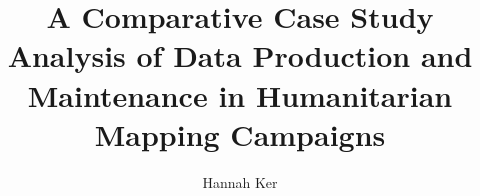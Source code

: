\makeatletter
\renewcommand {\@degree@string} {Master Science}
\makeatother

\title{A Comparative Case Study Analysis of Data Production and Maintenance in Humanitarian Mapping Campaigns}
\author{Hannah Ker}

\maketitle